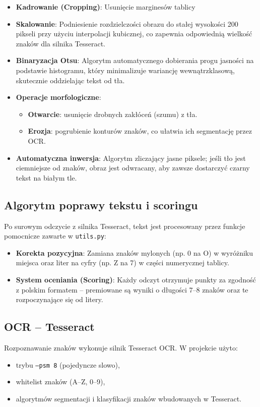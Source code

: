 \documentclass[12pt,a4paper]{article}
\begin{document}
\begin{itemize} 
    \item \textbf{Kadrowanie (Cropping)}: Usunięcie marginesów tablicy
    \item \textbf{Skalowanie}: Podniesienie rozdzielczości obrazu do stałej wysokości 200 pikseli przy użyciu interpolacji kubicznej, co zapewnia odpowiednią wielkość znaków dla silnika Tesseract. 
    \item \textbf{Binaryzacja Otsu}: Algorytm automatycznego dobierania progu jasności na podstawie histogramu, który minimalizuje wariancję wewnątrzklasową, skutecznie oddzielając tekst od tła. 
    \item \textbf{Operacje morfologiczne}: \begin{itemize} 
    \item \textbf{Otwarcie}: usunięcie drobnych zakłóceń (szumu) z tła. 
    \item \textbf{Erozja}: pogrubienie konturów znaków, co ułatwia ich segmentację przez OCR. \end{itemize} 
    \item \textbf{Automatyczna inwersja}: Algorytm zliczający jasne piksele; jeśli tło jest ciemniejsze od znaków, obraz jest odwracany, aby zawsze dostarczyć czarny tekst na białym tle. \end{itemize}

\subsection{Algorytm poprawy tekstu i scoringu} Po surowym odczycie z silnika Tesseract, tekst jest procesowany przez funkcje pomocnicze zawarte w \texttt{utils.py}:

\begin{itemize} \item \textbf{Korekta pozycyjna}: Zamiana znaków mylonych (np. 0 na O) w wyróżniku miejsca oraz liter na cyfry (np. Z na 7) w części numerycznej tablicy. \item \textbf{System oceniania (Scoring)}: Każdy odczyt otrzymuje punkty za zgodność z polskim formatem – premiowane są wyniki o długości 7--8 znaków oraz te rozpoczynające się od litery. \end{itemize}

\subsection{OCR – Tesseract}
Rozpoznawanie znaków wykonuje silnik Tesseract OCR.  
W projekcie użyto:
\begin{itemize}
    \item trybu \texttt{--psm 8} (pojedyncze slowo),
    \item whitelist znaków (A--Z, 0--9),
    \item algorytmów segmentacji i klasyfikacji znaków wbudowanych w Tesseract.
\end{itemize}
\end{document}
